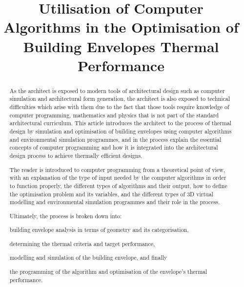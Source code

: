 \documentclass[11pt,a4paper,oneside]{article}
\title{\vspace{-15mm}%
	\Large \textbf{Utilisation of Computer Algorithms in the Optimisation of Building Envelopes Thermal Performance}}
\date{}
\begin{document}
\maketitle
\vspace{-1.5cm}
\begin{abstract}
\noindent As the architect is exposed to modern tools of architectural design such as computer simulation and architectural form generation, the architect is also exposed to technical difficulties which arise with them due to the fact that those tools require knowledge of computer programming, mathematics and physics that is not part of the standard architectural curriculum. This article introduces the architect to the process of thermal design by simulation and optimisation of building envelopes using computer algorithms and environmental simulation programmes, and in the process explain the essential concepts of computer programming and how it is integrated into the architectural design process to achieve thermally efficient designs.

\noindent The reader is introduced to computer programming from a theoretical point of view, with an explanation of the type of input needed by the computer algorithms in order to function properly, the different types of algorithms and their output, how to define the optimisation problem and its variables, and the different types of 3D virtual modelling and environmental simulation programmes and their role in the process.

\noindent Ultimately, the process is broken down into: \begin{inparaenum} \item building envelope analysis in terms of geometry and its categorisation, \item determining the thermal criteria and target performance, \item modelling and simulation of the building envelope, and finally \item the programming of the algorithm and optimisation of the envelope's thermal performance.\end{inparaenum}
\end{abstract}
\end{document}
